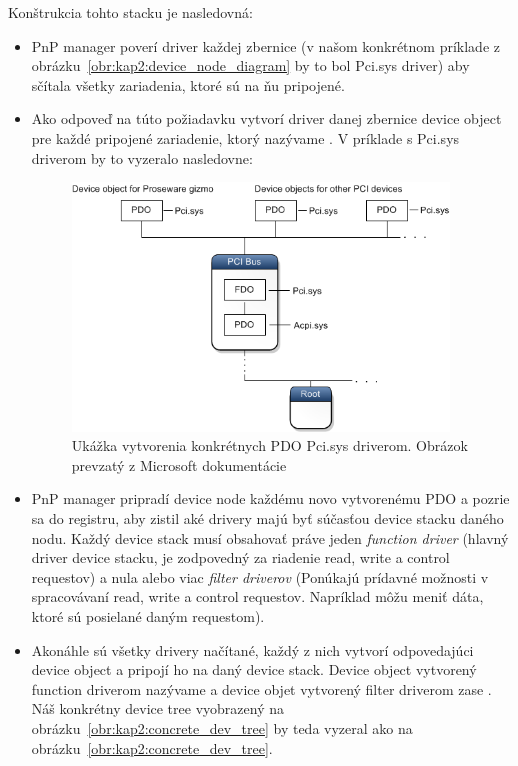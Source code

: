 Konštrukcia tohto stacku je nasledovná:
\begin{itemize}
\item PnP manager poverí driver každej zbernice (v našom konkrétnom príklade z obrázku~\ref{obr:kap2:device_node_diagram} by to bol Pci.sys driver) aby sčítala všetky zariadenia, ktoré sú na ňu pripojené.
\item Ako odpoveď na túto požiadavku vytvorí driver danej zbernice device object pre každé pripojené zariadenie, ktorý nazývame . V príklade s Pci.sys driverom by to vyzeralo nasledovne:

\begin{figure}[!htb]
	\centering
	\includegraphics[width=10cm]{img/kap02_PDO}
	\caption{Ukážka vytvorenia konkrétnych PDO Pci.sys driverom. Obrázok prevzatý z Microsoft dokumentácie~\cite{usb_msdn_device_node_stack}}
	\label{obr:kap2:pdo}
\end{figure}

\item PnP manager pripradí device node každému novo vytvorenému PDO a pozrie sa do registru, aby zistil aké drivery majú byť súčasťou device stacku daného nodu. Každý device stack musí obsahovať práve jeden \textit{function driver} (hlavný driver device stacku, je zodpovedný za riadenie read, write a control requestov) a nula alebo viac \textit{filter driverov} (Ponúkajú prídavné možnosti v spracovávaní read, write a control requestov. Napríklad môžu meniť dáta, ktoré sú posielané daným requestom).
\item Akonáhle sú všetky drivery načítané, každý z nich vytvorí odpovedajúci device object a pripojí ho na daný device stack. Device object vytvorený function driverom nazývame  a device objet vytvorený filter driverom zase . Náš konkrétny device tree vyobrazený na obrázku~\ref{obr:kap2:concrete_dev_tree} by teda vyzeral ako na obrázku~\ref{obr:kap2:concrete_dev_tree}.


\end{itemize}
